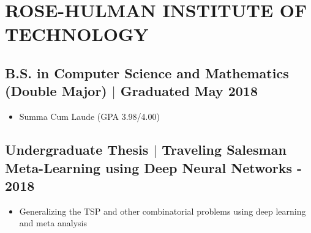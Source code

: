 \documentclass[10pt]{article}
\begin{document}

\section{ROSE-HULMAN INSTITUTE OF TECHNOLOGY}
\subsection{B.S. in Computer Science and Mathematics (Double Major) $\vert$ Graduated May 2018}
\begin{itemize}
    \item Summa Cum Laude (GPA 3.98/4.00)
\end{itemize}

\subsection{Undergraduate Thesis $\vert$ Traveling Salesman Meta-Learning using Deep Neural Networks - 2018}
\begin{itemize}
    \item Generalizing the TSP and other combinatorial problems using deep learning and meta analysis
\end{itemize}
\end{document}
